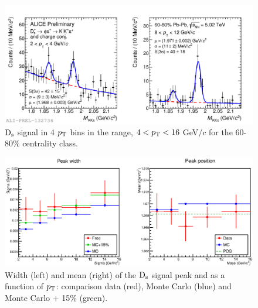 \begin{figure}[!h]
 \begin{center}
  \includegraphics[width=.9\textwidth]{FigCap5/MassDs_PbPb6080_5TeV_pt_2-4_8-12.pdf}
\end{center}
 \caption{${\rm D_s}$ signal in 4 $p_{\rm T}$ bins in the range, $4<p_{\rm T}<16$ GeV$/c$ for the 60-80$\%$ centrality class. }
 \label{FigInvMassDs_6080} 
\end{figure} 
 

\begin{figure}[!ht]
 \begin{center}
  \includegraphics[angle=0, width=15cm]{./FigCap5/MeanSigma_DataMC.eps}
 \end{center}
 \caption{Width (left) and mean (right) of the ${\rm D_s}$ signal peak and as a function of $p_{\rm T}$: comparison data (red), Monte Carlo (blue) and Monte Carlo + 15\% (green). }
 \label{MCsigmacheckDs} 
\end{figure} 


